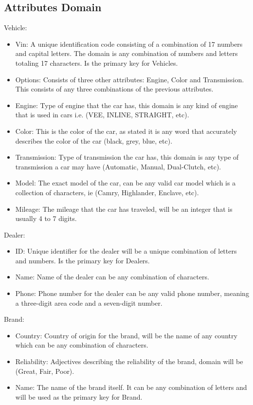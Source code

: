 \documentclass{math}
\begin{document}
\subsection*{Attributes Domain}
Vehicle:
\begin{itemize}
  \item Vin: A unique identification code consisting of a combination of 17
    numbers and capital letters. The domain is any combination of numbers and
    letters totaling 17 characters. Is the primary key for Vehicles.
  \item Options: Consists of three other attributes: Engine, Color and
    Transmission. This consists of any three combinations of the previous
    attributes.
  \item Engine: Type of engine that the car has, this domain is any kind of
    engine that is used in cars i.e. (VEE, INLINE, STRAIGHT, etc).
  \item Color: This is the color of the car, as stated it is any word that
    accurately describes the color of the car (black, grey, blue, etc).
  \item Transmission: Type of transmission the car has, this domain is any type
    of transmission a car may have (Automatic, Manual, Dual-Clutch, etc).
  \item Model: The exact model of the car, can be any valid car model which is
    a collection of characters, ie (Camry, Highlander, Enclave, etc).
  \item Mileage: The mileage that the car has traveled, will be an integer that
    is usually 4 to 7 digits.
\end{itemize}
Dealer:
\begin{itemize}
  \item ID: Unique identifier for the dealer will be a unique combination of
    letters and numbers. Is the primary key for Dealers.
  \item Name: Name of the dealer can be any combination of characters.
  \item Phone: Phone number for the dealer can be any valid phone number,
    meaning a three-digit area code and a seven-digit number.
\end{itemize}
Brand:
\begin{itemize}
  \item Country: Country of origin for the brand, will be the name of any
    country which can be any combination of characters.
  \item Reliability: Adjectives describing the reliability of the brand, domain
    will be (Great, Fair, Poor).
  \item Name: The name of the brand itself. It can be any combination of
    letters and will be used as the primary key for Brand.
\end{itemize}
\end{document}
